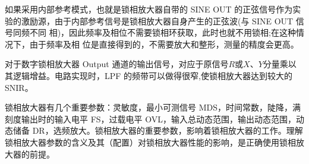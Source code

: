 \documentclass[11pt,a4paper]{ctexart}
\begin{document}
\par
如果采用内部参考模式，也就是锁相放大器自带的 SINE OUT 的正弦信号作为实 验的激励源，由于内部参考信号是锁相放大器自身产生的正弦波(与 SINE OUT 信号同频不同 相)，因此频率及相位不需要锁相环获取，此时也就不用锁相;在这种情况下，由于频率及相 位是直接得到的，不需要放大和整形，测量的精度会更高。
\par

对于数字锁相放大器 Output 通道的输出信号，对应于原信号$R$或$X$、$Y$分量乘以其逻辑增益。电路实现时，LPF 的频带可以做得很窄,使锁相放大器达到较大的 SNIR。
\par
锁相放大器有几个重要参数：灵敏度，最小可测信号 MDS，时间常数，陡降，满刻度输出时的输入电平 FS，过载电平 OVL，输入总动态范围，输出动态范围，动态储备 DR，选频放大。锁相放大器的重要参数，影响着锁相放大器的工作。理解锁相放大器参数的含义及其（配置）对锁相放大器性能的影响，是正确使用锁相放大器的前提。
\end{document}
